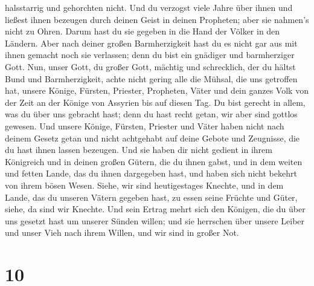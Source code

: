 halsstarrig und gehorchten nicht.  Und du verzogst viele
Jahre über ihnen und ließest ihnen bezeugen durch deinen Geist in deinen
Propheten; aber sie nahmen's nicht zu Ohren. Darum hast du sie gegeben
in die Hand der Völker in den Ländern.  Aber nach deiner
großen Barmherzigkeit hast du es nicht gar aus mit ihnen gemacht noch
sie verlassen; denn du bist ein gnädiger und barmherziger Gott.
 Nun, unser Gott, du großer Gott, mächtig und
schrecklich, der du hältst Bund und Barmherzigkeit, achte nicht gering
alle die Mühsal, die uns getroffen hat, unsere Könige, Fürsten,
Priester, Propheten, Väter und dein ganzes Volk von der Zeit an der
Könige von Assyrien bis auf diesen Tag.  Du bist gerecht
in allem, was du über uns gebracht hast; denn du hast recht getan, wir
aber sind gottlos gewesen.  Und unsere Könige, Fürsten,
Priester und Väter haben nicht nach deinem Gesetz getan und nicht
achtgehabt auf deine Gebote und Zeugnisse, die du hast ihnen lassen
bezeugen.  Und sie haben dir nicht gedient in ihrem
Königreich und in deinen großen Gütern, die du ihnen gabst, und in dem
weiten und fetten Lande, das du ihnen dargegeben hast, und haben sich
nicht bekehrt von ihrem bösen Wesen.  Siehe, wir sind
heutigestages Knechte, und in dem Lande, das du unseren Vätern gegeben
hast, zu essen seine Früchte und Güter, siehe, da sind wir Knechte.
 Und sein Ertrag mehrt sich den Königen, die du über uns
gesetzt hast um unserer Sünden willen; und sie herrschen über unsere
Leiber und unser Vieh nach ihrem Willen, und wir sind in großer Not.

\hypertarget{section-9}{%
\section{10}\label{section-9}}

